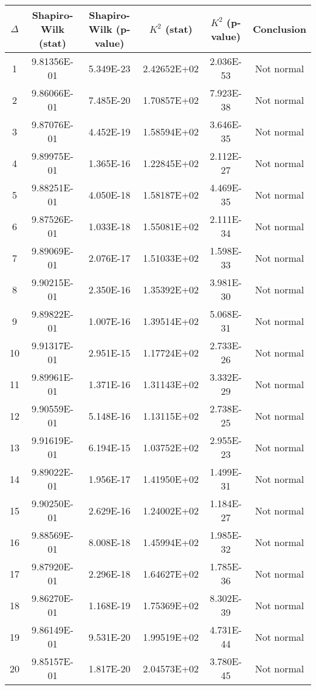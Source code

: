 \begin{table}[h]
	\begin{tabular}{|c|c|c|c|c|c|}
		\hline
		$\Delta$ &  Shapiro-Wilk (stat) & Shapiro-Wilk (p-value) & $K^2$ (stat) & $K^2$ (p-value) & Conclusion\\\hline
		\hline
		1 & 9.81356E-01 & 5.349E-23 & 2.42652E+02 & 2.036E-53 & Not normal\\\hline
		2 & 9.86066E-01 & 7.485E-20 & 1.70857E+02 & 7.923E-38 & Not normal\\\hline
		3 & 9.87076E-01 & 4.452E-19 & 1.58594E+02 & 3.646E-35 & Not normal\\\hline
		4 & 9.89975E-01 & 1.365E-16 & 1.22845E+02 & 2.112E-27 & Not normal\\\hline
		5 & 9.88251E-01 & 4.050E-18 & 1.58187E+02 & 4.469E-35 & Not normal\\\hline
		6 & 9.87526E-01 & 1.033E-18 & 1.55081E+02 & 2.111E-34 & Not normal\\\hline
		7 & 9.89069E-01 & 2.076E-17 & 1.51033E+02 & 1.598E-33 & Not normal\\\hline
		8 & 9.90215E-01 & 2.350E-16 & 1.35392E+02 & 3.981E-30 & Not normal\\\hline
		9 & 9.89822E-01 & 1.007E-16 & 1.39514E+02 & 5.068E-31 & Not normal\\\hline
		10 & 9.91317E-01 & 2.951E-15 & 1.17724E+02 & 2.733E-26 & Not normal\\\hline
		11 & 9.89961E-01 & 1.371E-16 & 1.31143E+02 & 3.332E-29 & Not normal\\\hline
		12 & 9.90559E-01 & 5.148E-16 & 1.13115E+02 & 2.738E-25 & Not normal\\\hline
		13 & 9.91619E-01 & 6.194E-15 & 1.03752E+02 & 2.955E-23 & Not normal\\\hline
		14 & 9.89022E-01 & 1.956E-17 & 1.41950E+02 & 1.499E-31 & Not normal\\\hline
		15 & 9.90250E-01 & 2.629E-16 & 1.24002E+02 & 1.184E-27 & Not normal\\\hline
		16 & 9.88569E-01 & 8.008E-18 & 1.45994E+02 & 1.985E-32 & Not normal\\\hline
		17 & 9.87920E-01 & 2.296E-18 & 1.64627E+02 & 1.785E-36 & Not normal\\\hline
		18 & 9.86270E-01 & 1.168E-19 & 1.75369E+02 & 8.302E-39 & Not normal\\\hline
		19 & 9.86149E-01 & 9.531E-20 & 1.99519E+02 & 4.731E-44 & Not normal\\\hline
		20 & 9.85157E-01 & 1.817E-20 & 2.04573E+02 & 3.780E-45 & Not normal\\\hline

\end{tabular}
\end{table}
